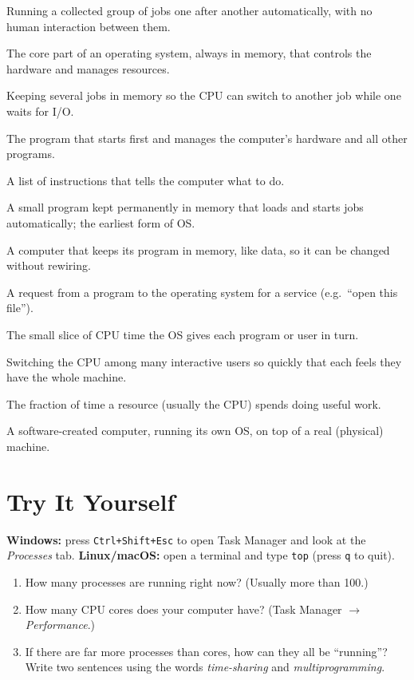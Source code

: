 \documentclass[11pt,a4paper]{article}
\newcommand{\cmd}[1]{\texttt{#1}}
\begin{document}
\begin{description}[leftmargin=0pt,style=nextline,itemsep=0.2em]
  \item[Batch processing] Running a collected group of jobs one after another automatically, with no human interaction between them.
  \item[Kernel] The core part of an operating system, always in memory, that controls the hardware and manages resources.
  \item[Multiprogramming] Keeping several jobs in memory so the CPU can switch to another job while one waits for I/O.
  \item[Operating system (OS)] The program that starts first and manages the computer's hardware and all other programs.
  \item[Program] A list of instructions that tells the computer what to do.
  \item[Resident monitor] A small program kept permanently in memory that loads and starts jobs automatically; the earliest form of OS.
  \item[Stored-program computer] A computer that keeps its program in memory, like data, so it can be changed without rewiring.
  \item[System call] A request from a program to the operating system for a service (e.g.\ ``open this file'').
  \item[Time quantum] The small slice of CPU time the OS gives each program or user in turn.
  \item[Time-sharing] Switching the CPU among many interactive users so quickly that each feels they have the whole machine.
  \item[Utilization] The fraction of time a resource (usually the CPU) spends doing useful work.
  \item[Virtual machine] A software-created computer, running its own OS, on top of a real (physical) machine.
\end{description}

\section{Try It Yourself}

\begin{tryit}
\textbf{Windows:} press \cmd{Ctrl+Shift+Esc} to open Task Manager and look at the \emph{Processes} tab. \textbf{Linux/macOS:} open a terminal and type \cmd{top} (press \cmd{q} to quit).
\begin{enumerate}[leftmargin=1.4em]
  \item How many processes are running right now? (Usually more than 100.)
  \item How many CPU cores does your computer have? (Task Manager $\to$ \emph{Performance}.)
  \item If there are far more processes than cores, how can they all be ``running''? Write two sentences using the words \emph{time-sharing} and \emph{multiprogramming}.
\end{enumerate}
\end{tryit}
\end{document}
